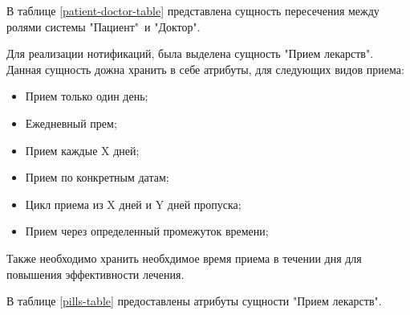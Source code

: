 \documentclass[14pt]{extreport}
\begin{document}
    В таблице \ref{patient-doctor-table} представлена сущность пересечения между %
    ролями системы "Пациент"\ и "Доктор".
    \newline
    \begin{table}[H]
        \caption{Описание атрибутов сущности пересечения ролей  "Пациент"\ и "Доктор".}
        \label{patient-doctor-table}
    \end{table}

    Для реализации нотификаций, была выделена сущность "Прием лекарств". %
    Данная сущность дожна хранить в себе атрибуты, для следующих видов приема:
    
    \begin{itemize}
        \item Прием только один день;
        \item Ежедневный прем;
        \item Прием каждые X дней;
        \item Прием по конкретным датам;
        \item Цикл приема из X дней и Y дней пропуска; 
        \item Прием через определенный промежуток времени;
    \end{itemize}

    Также необходимо хранить необхдимое время приема в течении дня для повышения %
    эффективности лечения.

    В таблице \ref{pills-table} предоставлены атрибуты сущности "Прием лекарств".
    \newline
\end{document}
